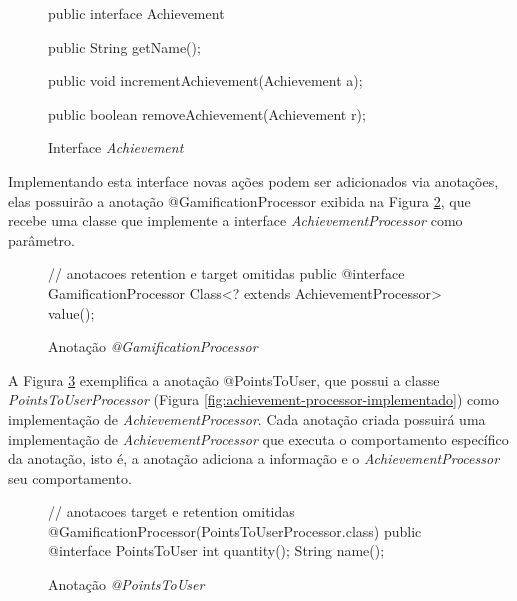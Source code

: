 \begin{figure}[H]
    \centering
    \caption{Interface \textit{Achievement}}
    \begin{java}
public interface Achievement {
    
	public String getName();

	public void incrementAchievement(Achievement a);

	public boolean removeAchievement(Achievement r);
}
    \end{java}
    \label{fig:interface-achievement}
\end{figure}

\par Implementando esta interface novas ações podem ser adicionados via anotações, elas possuirão a anotação @GamificationProcessor exibida na Figura \ref{fig:gamification-processor}, que recebe uma classe que implemente a interface \textit{AchievementProcessor} como parâmetro.

\begin{figure}
    \centering
    \caption{Anotação \textit{@GamificationProcessor}}
    \begin{java}
// anotacoes retention e target omitidas
public @interface GamificationProcessor {
	Class<? extends AchievementProcessor> value();
}

    \end{java}
    \label{fig:gamification-processor}
\end{figure}

\par A Figura \ref{fig:points-to-user} exemplifica a anotação @PointsToUser, que possui a classe \textit{PointsToUserProcessor} (Figura \ref{fig:achievement-processor-implementado}) como implementação de \textit{AchievementProcessor}. Cada anotação criada possuirá uma implementação de \textit{AchievementProcessor} que executa o comportamento específico da anotação, isto é, a anotação adiciona a informação e o \textit{AchievementProcessor} seu comportamento.


\begin{figure}[H]
    \centering
    \caption{Anotação \textit{@PointsToUser}}
    \begin{java}
// anotacoes target e retention omitidas
@GamificationProcessor(PointsToUserProcessor.class)
public @interface PointsToUser {	
	int quantity();
	String name();
}
    \end{java}
    \label{fig:points-to-user}
\end{figure}

